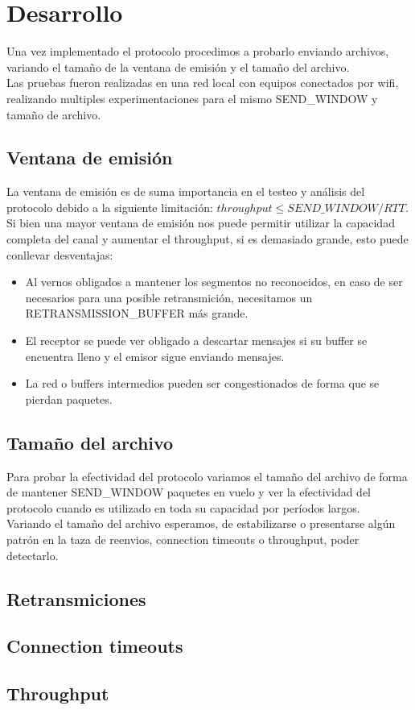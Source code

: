 \section{Desarrollo}

Una vez implementado el protocolo procedimos a probarlo enviando archivos, variando el tamaño de la ventana de emisión y el tamaño del archivo.	 \\
Las pruebas fueron realizadas en una red local con equipos conectados por wifi, realizando multiples experimentaciones para el mismo SEND\_WINDOW y tamaño de archivo.	\\

\subsection{Ventana de emisión}

La ventana de emisión es de suma importancia en el testeo y análisis del protocolo debido a la siguiente limitación: $throughput \leq SEND\_WINDOW / RTT$.	\\
Si bien una mayor ventana de emisión nos puede permitir utilizar la capacidad completa del canal y aumentar el throughput, si es demasiado grande, esto puede conllevar desventajas: 
\begin{itemize}
\item	Al vernos obligados a mantener los segmentos no reconocidos, en caso de ser necesarios para una posible retransmición, necesitamos un RETRANSMISSION\_BUFFER más grande.
\item	El receptor se puede ver obligado a descartar mensajes si su buffer se encuentra lleno y el emisor sigue enviando mensajes.
\item	La red o buffers intermedios pueden ser congestionados de forma que se pierdan paquetes.
\end{itemize}

\subsection{Tamaño del archivo}

Para probar la efectividad del protocolo variamos el tamaño del archivo de forma de mantener SEND\_WINDOW 
paquetes en vuelo y ver la efectividad del protocolo cuando es utilizado en toda su capacidad por períodos largos.	\\
Variando el tamaño del archivo esperamos, de estabilizarse o presentarse algún patrón en la taza de reenvios, connection timeouts o throughput, poder detectarlo.

\subsection{Retransmiciones}



\subsection{Connection timeouts}



\subsection{Throughput}


